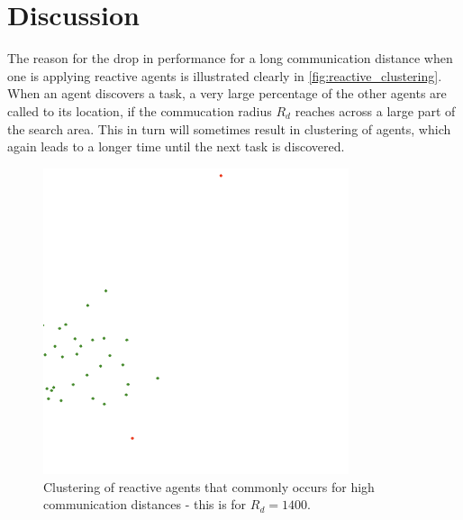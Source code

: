 \documentclass[11pt]{article}
\begin{document}
    \section{Discussion}

        The reason for the drop in performance for a long communication distance when 
        one is applying reactive agents is illustrated clearly in \autoref{fig:reactive_clustering}.
        When an agent discovers a task, a very large percentage of the other agents are called to its
        location, if the commucation radius $R_d$ reaches across a large part of the search area. This 
        in turn will sometimes result in clustering of agents, which again leads to a longer time until 
        the next task is discovered.

        \begin{figure}
            \centering
            \includegraphics[width=0.8\textwidth]{figures/screenshot.png}
            \caption{
                Clustering of reactive agents that commonly occurs for high communication 
                distances - this is for $R_d = 1400$.
                \label{fig:reactive_clustering}
            }
        \end{figure}
\end{document}
